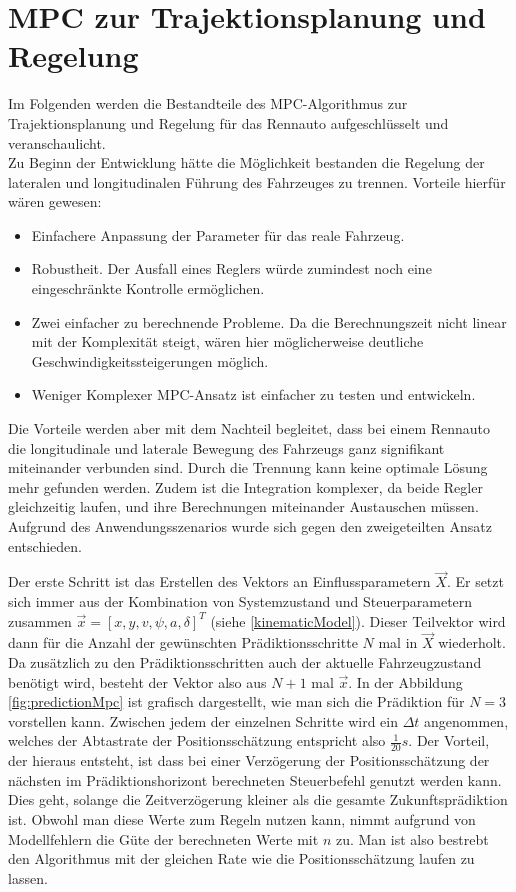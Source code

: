 \documentclass{like}
\begin{document}
\chapter{MPC zur Trajektionsplanung und Regelung}
Im Folgenden werden die Bestandteile des \acl{MPC}-Algorithmus zur Trajektionsplanung und Regelung für das Rennauto aufgeschlüsselt und veranschaulicht.\\

Zu Beginn der Entwicklung hätte die Möglichkeit bestanden die Regelung der lateralen und longitudinalen Führung des Fahrzeuges zu trennen. 
Vorteile hierfür wären gewesen:
\begin{itemize}
	\item Einfachere Anpassung der Parameter für das reale Fahrzeug.
	\item Robustheit. Der Ausfall eines Reglers würde zumindest noch eine eingeschränkte Kontrolle ermöglichen.
	\item Zwei einfacher zu berechnende Probleme. Da die Berechnungszeit nicht linear mit der Komplexität steigt, wären hier möglicherweise deutliche Geschwindigkeitssteigerungen möglich.
	\item Weniger Komplexer \ac{MPC}-Ansatz ist einfacher zu testen und entwickeln.
\end{itemize}

Die Vorteile werden aber mit dem Nachteil begleitet, dass bei einem Rennauto die longitudinale und laterale Bewegung des Fahrzeugs ganz signifikant miteinander verbunden sind. Durch die Trennung kann keine optimale Lösung mehr gefunden werden. 
Zudem ist die Integration komplexer, da beide Regler gleichzeitig laufen, und ihre Berechnungen miteinander Austauschen müssen.
Aufgrund des Anwendungsszenarios wurde sich gegen den zweigeteilten Ansatz entschieden.


Der erste Schritt ist das Erstellen des Vektors an Einflussparametern $\vec{X}$. Er setzt sich immer aus der Kombination von Systemzustand und Steuerparametern zusammen  $\vec{x} = [x, y, v, \psi, a, \delta ]^T $ (siehe \ref{kinematicModel}). 
Dieser Teilvektor wird dann für die Anzahl der gewünschten Prädiktionsschritte \(N\) mal in $\vec{X}$ wiederholt. Da zusätzlich zu den Prädiktionsschritten auch der aktuelle Fahrzeugzustand benötigt wird, besteht der Vektor also aus $N+1$ mal $\vec{x}$. In der Abbildung \ref{fig:predictionMpc} ist grafisch dargestellt, wie man sich die Prädiktion für $N=3$ vorstellen kann. Zwischen jedem der einzelnen Schritte wird ein $\Delta t$ angenommen, welches der Abtastrate der Positionsschätzung entspricht also $\frac{1}{20} s$. Der Vorteil, der hieraus entsteht, ist dass bei einer Verzögerung der Positionsschätzung der nächsten im Prädiktionshorizont berechneten Steuerbefehl genutzt werden kann. Dies geht, solange die Zeitverzögerung kleiner als die gesamte Zukunftsprädiktion ist. Obwohl man diese Werte zum Regeln nutzen kann, nimmt aufgrund von Modellfehlern die Güte der berechneten Werte mit \(n\) zu. Man ist also bestrebt den Algorithmus mit der gleichen Rate wie die Positionsschätzung laufen zu lassen. 
\end{document}
